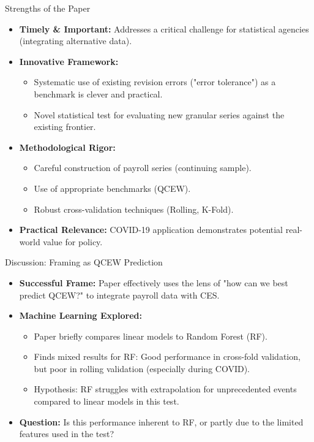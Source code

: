 \documentclass{beamer}
\begin{document}
\begin{frame}{Strengths of the Paper}
    \begin{itemize}
        \item \textbf{Timely \& Important:} Addresses a critical challenge for statistical agencies (integrating alternative data).
        \item \textbf{Innovative Framework:}
        \begin{itemize}
            \item Systematic use of existing revision errors ("error tolerance") as a benchmark is clever and practical.
            \item Novel statistical test for evaluating new granular series against the existing frontier.
        \end{itemize}
        \item \textbf{Methodological Rigor:}
        \begin{itemize}
            \item Careful construction of payroll series (continuing sample).
            \item Use of appropriate benchmarks (QCEW).
            \item Robust cross-validation techniques (Rolling, K-Fold).
        \end{itemize}
        \item \textbf{Practical Relevance:} COVID-19 application demonstrates potential real-world value for policy.
    \end{itemize}
\end{frame}

\begin{frame}{Discussion: Framing as QCEW Prediction}
    \begin{itemize}
        \item \textbf{Successful Frame:} Paper effectively uses the lens of "how can we best predict QCEW?" to integrate payroll data with CES.
        \item \textbf{Machine Learning Explored:}
            \begin{itemize}
                \item Paper briefly compares linear models to Random Forest (RF).
                \item Finds mixed results for RF: Good performance in cross-fold validation, but poor in rolling validation (especially during COVID).
                \item Hypothesis: RF struggles with extrapolation for unprecedented events compared to linear models in this test.
            \end{itemize}
        \item \textbf{Question:} Is this performance inherent to RF, or partly due to the limited features used in the test?
    \end{itemize}
\end{frame}
\end{document}
